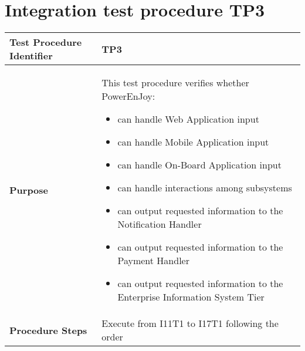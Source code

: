 \section{Integration test procedure TP3} \label{TP3}
\begin{center}
	\vspace{0.6cm}
	\begin{tabular}{|l|p{9cm}|}
		\hline
		\textbf{Test Procedure Identifier} & TP3 \bigstrut \\\hline
		\textbf{Purpose} 
		& This test procedure verifies whether PowerEnJoy: 
		\begin{itemize} 
			\item can handle Web Application input
			\item can handle Mobile Application input
			\item can handle On-Board Application input
			\item can handle interactions among subsystems 
			\item can output requested information to the Notification Handler
			\item can output requested information to the Payment Handler
			\item can output requested information to the Enterprise Information System Tier
		\end{itemize} \bigstrut \\\hline
		\textbf{Procedure Steps} & Execute from I11T1 to I17T1 following the order \bigstrut \\\hline
	\end{tabular}
\end{center}